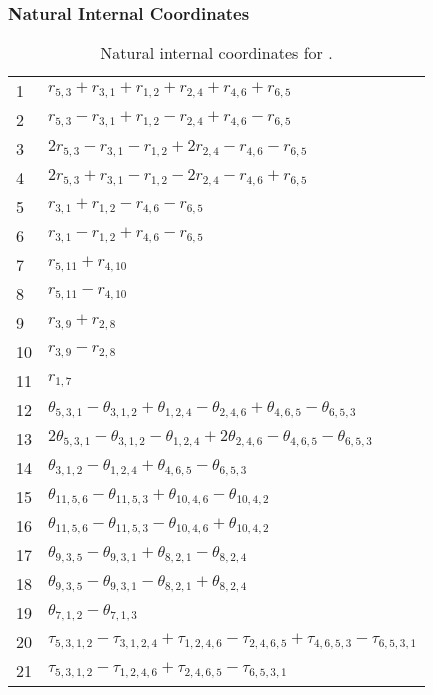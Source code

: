 \documentclass[10pt,oneside]{article}
\begin{document}
\begin{table}[h!]
\subsubsection*{Natural Internal Coordinates}
\centering
\caption{Natural internal coordinates for .}
\small
\begin{tabular}{ll}
\toprule
  1   & $r_{5,3} + r_{3,1} + r_{1,2} + r_{2,4} + r_{4,6} + r_{6,5}$ \\
  2   & $r_{5,3} - r_{3,1} + r_{1,2} - r_{2,4} + r_{4,6} - r_{6,5}$ \\
  3   & $2r_{5,3} - r_{3,1} - r_{1,2} + 2r_{2,4} - r_{4,6} - r_{6,5}$ \\
  4   & $2r_{5,3} + r_{3,1} - r_{1,2} - 2r_{2,4} - r_{4,6} + r_{6,5}$ \\
  5   & $r_{3,1} + r_{1,2} - r_{4,6} - r_{6,5}$ \\
  6   & $r_{3,1} - r_{1,2} + r_{4,6} - r_{6,5}$ \\
  7   & $r_{5,11} + r_{4,10}$ \\
  8   & $r_{5,11} - r_{4,10}$ \\
  9   & $r_{3,9} + r_{2,8}$ \\
  10  & $r_{3,9} - r_{2,8}$ \\
  11  & $r_{1,7}$ \\
  12  & $\theta_{5,3,1} - \theta_{3,1,2} + \theta_{1,2,4} - \theta_{2,4,6} + \theta_{4,6,5} - \theta_{6,5,3}$ \\
  13  & $2\theta_{5,3,1} - \theta_{3,1,2} - \theta_{1,2,4} + 2\theta_{2,4,6} - \theta_{4,6,5} - \theta_{6,5,3}$ \\
  14  & $\theta_{3,1,2} - \theta_{1,2,4} + \theta_{4,6,5} - \theta_{6,5,3}$ \\
  15  & $\theta_{11,5,6} - \theta_{11,5,3} + \theta_{10,4,6} - \theta_{10,4,2}$ \\
  16  & $\theta_{11,5,6} - \theta_{11,5,3} - \theta_{10,4,6} + \theta_{10,4,2}$ \\
  17  & $\theta_{9,3,5} - \theta_{9,3,1} + \theta_{8,2,1} - \theta_{8,2,4}$ \\
  18  & $\theta_{9,3,5} - \theta_{9,3,1} - \theta_{8,2,1} + \theta_{8,2,4}$ \\
  19  & $\theta_{7,1,2} - \theta_{7,1,3}$ \\
  20  & $\tau_{5,3,1,2} - \tau_{3,1,2,4} + \tau_{1,2,4,6} - \tau_{2,4,6,5} + \tau_{4,6,5,3} - \tau_{6,5,3,1}$ \\
  21  & $\tau_{5,3,1,2} - \tau_{1,2,4,6} + \tau_{2,4,6,5} - \tau_{6,5,3,1}$ \\

\end{tabular}
\end{table}
\end{document}
